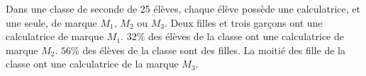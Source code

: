 \documentclass[10pt,french]{book}
\begin{document}
\begin{center}
\end{center}\bigskip

\exo Dans une classe de seconde de 25 élèves, chaque élève possède une calculatrice, et une seule, de marque $M_1$, $M_2$ ou $M_3$. Deux filles et trois garçons ont une calculatrice de marque $M_1$. $32\%$ des élèves de la classe ont une calculatrice de marque $M_2$. $56\%$ des élèves de la classe sont des filles. La moitié des fille de la classe ont une calculatrice de la marque $M_3$.
\end{document}
